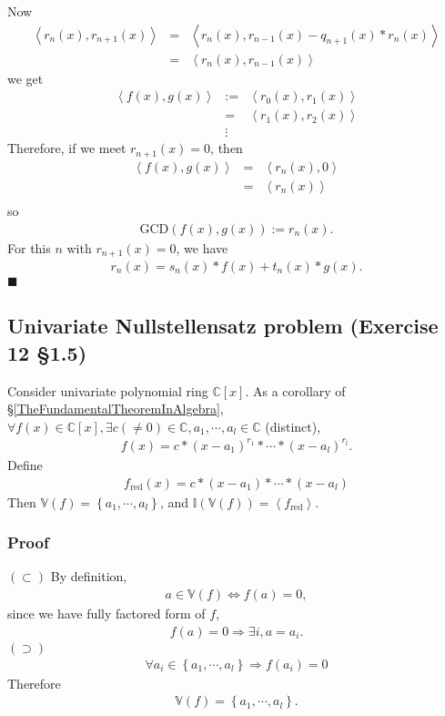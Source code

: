 \documentclass[11pt]{book}
\begin{document}
Now
\begin{eqnarray}
\left< r_n(x), r_{n+1}(x) \right>
&=& \left< r_n(x), r_{n-1}(x) - q_{n+1}(x) * r_n(x) \right> \\
&=& \left< r_n(x), r_{n-1}(x) \right>
\end{eqnarray}
we get
\begin{eqnarray}
\left< f(x), g(x) \right> &:=& \left< r_0(x), r_1(x) \right> \\
&=& \left< r_1(x), r_2(x) \right> \\
\nonumber &\vdots& 
\end{eqnarray}
Therefore, if we meet $r_{n+1}(x) = 0$, then
\begin{eqnarray}
\left< f(x), g(x) \right>  &=& \left< r_n(x), 0 \right> \\
&=& \left< r_n(x)\right> \\
\end{eqnarray}
so
\begin{eqnarray}
\text{GCD}\left( f(x), g(x) \right) := r_n(x).
\end{eqnarray}
For this $n$ with $r_{n+1}(x) = 0$, we have
\begin{eqnarray}
r_n(x) = s_n(x) * f(x) + t_n(x) * g(x).
\end{eqnarray}
$\blacksquare$

\subsection{Univariate Nullstellensatz problem (Exercise 12 \S1.5)}
Consider univariate polynomial ring $\mathbb{C}[x]$.
As a corollary of \S \ref{TheFundamentalTheoremInAlgebra}, $\forall f(x) \in \mathbb{C}[x], \exists c (\neq 0) \in \mathbb{C}, a_1,\cdots, a_l \in \mathbb{C}$ (distinct),
\begin{eqnarray}
f(x) = c * (x -a_1)^{r_1} *\cdots * (x-a_l)^{r_l}.
\end{eqnarray}
Define
\begin{eqnarray}
f_\text{red}(x) = c * (x -a_1) *\cdots * (x-a_l)
\end{eqnarray}
Then $\mathbb{V}(f) = \left\{a_1, \cdots, a_l \right\}$, and $\mathbb{I}\left( \mathbb{V}(f) \right) = \left< f_\text{red} \right>$.

\subsubsection{Proof}
$(\subset)$ By definition,
\begin{eqnarray}
a \in \mathbb{V}(f) \Leftrightarrow f(a) = 0,
\end{eqnarray}
since we have fully factored form of $f$,
\begin{eqnarray}
f(a) = 0 \Rightarrow \exists i, a = a_i.
\end{eqnarray}
$(\supset)$ 
\begin{eqnarray}
\forall a_i \in \left\{a_1, \cdots, a_l \right\} \Rightarrow f(a_i) = 0 
\end{eqnarray}
Therefore 
\begin{eqnarray}
\mathbb{V}(f) = \left\{a_1, \cdots, a_l \right\}.
\end{eqnarray}
\end{document}
